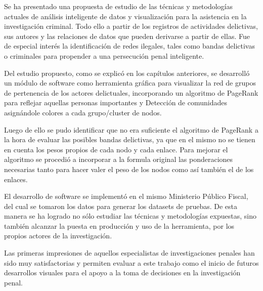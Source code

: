 Se ha presentado una propuesta de estudio de las técnicas y metodologías actuales de análisis inteligente de datos y visualización para la asistencia en la investigación criminal. Todo ello a partir de los registros de actividades delictivas, sus autores y las relaciones de datos que pueden derivarse a partir de ellas. Fue de especial interés la identificación de redes ilegales, tales como bandas delictivas o criminales para propender a una persecución penal inteligente.

Del estudio propuesto, como se explicó en los capítulos anteriores, se desarrolló un módulo de software como herramienta gráfica para visualizar la red de grupos de pertenencia de los actores delictuales, incorporando un algoritmo de PageRank para reflejar aquellas personas importantes y Detección de comunidades asignándole colores a cada grupo/cluster de nodos.

Luego de ello se pudo identificar que no era suficiente el algoritmo de PageRank a la hora de evaluar las posibles bandas delictivas, ya que en el mismo no se tienen en cuenta los pesos propios de cada nodo y cada enlace. Para mejorar el algoritmo se procedió a incorporar a la formula original las ponderaciones necesarias tanto para hacer valer el peso de los nodos como así también el de los enlaces.

El desarrollo de software se implementó en el mismo Ministerio Público Fiscal, del cual se tomaron los datos para generar los datasets de pruebas. De esta manera se ha logrado no sólo estudiar las técnicas y metodologías expuestas, sino también alcanzar la puesta en producción y uso de la herramienta, por los propios actores de la investigación.

Las primeras impresiones de aquellos especialistas de investigaciones penales han sido muy satisfactorias y permiten evaluar a este trabajo como el inicio de futuros desarrollos visuales para el apoyo a la toma de decisiones en la investigación penal.
